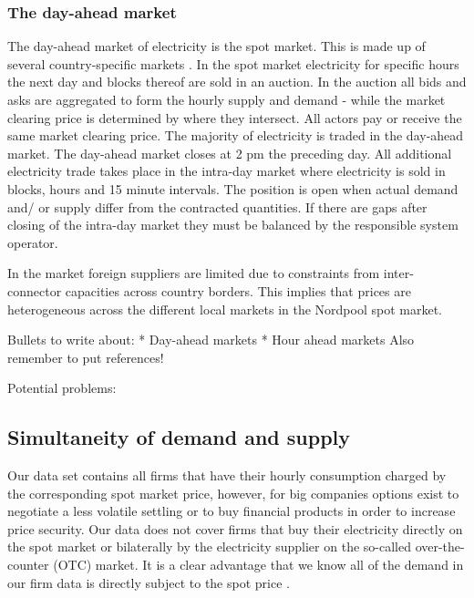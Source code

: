 \subsubsection{The day-ahead market}
The day-ahead market of electricity is the spot market. This is made up of several country-specific markets . In the spot market electricity for specific hours the next day and blocks thereof are sold in an auction. In the auction all bids and asks are aggregated to form the hourly supply and demand - while the market clearing price is determined by where they intersect. All actors pay or receive the same market clearing price. The majority of electricity is traded in the day-ahead market. %
The day-ahead market closes at 2 pm the preceding day. All additional electricity trade takes place in the intra-day market where electricity is sold in blocks, hours and 15 minute intervals. The position is open when actual demand and/ or supply differ from the contracted quantities. If there are gaps after closing of the intra-day market they must be balanced by the responsible system operator.  



In the market foreign suppliers are limited due to constraints from inter-connector capacities across country borders. This implies that prices are heterogeneous across the different local markets in the Nordpool spot market. 

Bullets to write about: 
* Day-ahead markets
* Hour ahead markets 
Also remember to put references! 

Potential problems: 


\subsection{Simultaneity of demand and supply}
\label{subsec:t_simultaneity}
Our data set contains all firms that have their hourly consumption charged by the corresponding spot market price, however, for big companies options exist to negotiate a less volatile settling or to buy financial products in order to increase price security. Our data does not cover firms that buy their electricity directly on the spot market or bilaterally by the electricity supplier on the so-called over-the-counter (OTC) market. It is a clear advantage that we know all of the demand in our firm data is directly subject to the spot price \citep{lijesen2007real}.


